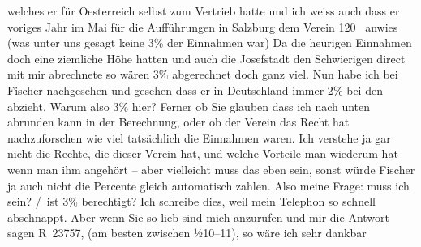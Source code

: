 \begin{ledgroupsized}[t]{13cm}
                    welches er für Oesterreich selbst zum
                    Vertrieb hatte und ich weiss auch dass er voriges Jahr im Mai für
                    die Aufführungen in Salzburg dem Verein
                        120 \label{K_L02525_1v}\label{K_L02525_1h} anwies (was unter uns gesagt keine 3{\%} der Einnahmen war) Da die heurigen Einnahmen doch
                    eine ziemliche Höhe hatten und auch die Josefstadt den Schwierigen direct
                    mit mir abrechnete so wären 3{\%}{ } abgerechnet doch ganz
                    viel.\pend
           \pstart
           Nun habe ich bei Fischer nachgesehen und gesehen
                    dass er in Deutschland immer 2{\%} bei den \label{T_L02525_1v}\label{T_L02525_1h} abzieht. Warum also 3{\%} hier? Ferner ob Sie glauben dass ich nach unten
                    abrunden kann in der Berechnung, oder ob der Verein das Recht hat nachzuforschen wie viel tatsächlich
                    die Einnahmen waren. Ich verstehe ja gar nicht die Rechte, die dieser Verein hat, und welche
                    Vorteile man wiederum hat wenn man ihm angehört – aber vielleicht muss das eben
                    sein, sonst würde Fischer ja auch nicht die Percente gleich automatisch
                    zahlen.\pend
           \pstart
           Also meine Frage: muss ich  sein?\pend
           / ist 3{\%} berechtigt?\pend
           \pstart
           Ich schreibe dies, weil mein Telephon so schnell abschnappt. Aber wenn Sie so
                    lieb sind mich anzurufen und mir die Antwort sagen R 23757, (am besten zwischen
                        ½10–11), so wäre ich sehr dankbar\pend

\end{ledgroupsized}
